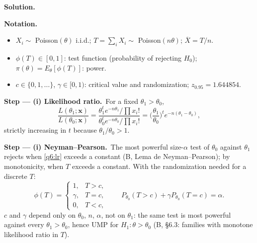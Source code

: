\documentclass[11pt,a4paper]{article}
\numberwithin{equation}{questao}   %
\newenvironment{notacao}{\par\smallskip\noindent\textbf{Notation.}\begin{itemize}[leftmargin=1.4em,topsep=1pt,itemsep=0pt]\small}{\end{itemize}}
\newcommand{\passo}[2]{\par\smallskip\noindent\textbf{Step --- #1.}~#2}
\newcommand{\solhead}{\par\medskip\noindent{\color{blue!55!black}\rule{\linewidth}{0.3pt}}\par\noindent\textbf{Solution.}}
\newcommand{\1}{\mathbf{1}}
\begin{document}
\begin{sol}
\solhead
\begin{notacao}
\item $X_i\sim$ Poisson$(\theta)$ i.i.d.; $T=\sum_iX_i\sim$ Poisson$(n\theta)$; $\overline X=T/n$.
\item $\phi(T)\in[0,1]$: test function (probability of rejecting $H_0$); $\pi(\theta)=E_\theta[\phi(T)]$: power.
\item $c\in\{0,1,\dots\}$, $\gamma\in[0,1)$: critical value and randomization; $z_{0.95}=1.644854$.
\end{notacao}

\passo{(i) Likelihood ratio}{For a fixed $\theta_1>\theta_0$,}
\begin{equation}\label{q6:lr}
\frac{L(\theta_1;\mathbf x)}{L(\theta_0;\mathbf x)}=\frac{\theta_1^te^{-n\theta_1}/\prod x_i!}{\theta_0^te^{-n\theta_0}/\prod x_i!}
=\Big(\frac{\theta_1}{\theta_0}\Big)^{t}e^{-n(\theta_1-\theta_0)},
\end{equation}
strictly increasing in $t$ because $\theta_1/\theta_0>1$.

\passo{(i) Neyman--Pearson}{The most powerful size-$\alpha$ test of $\theta_0$ against $\theta_1$
rejects when \eqref{q6:lr} exceeds a constant (B, Lema de Neyman--Pearson); by monotonicity, when
$T$ exceeds a constant. With the randomization needed for a discrete $T$:}
\begin{equation}\label{q6:phi}
\phi(T)=\begin{cases}1,&T>c,\\ \gamma,&T=c,\\ 0,&T<c,\end{cases}\qquad
P_{\theta_0}(T>c)+\gamma P_{\theta_0}(T=c)=\alpha .
\end{equation}
$c$ and $\gamma$ depend only on $\theta_0$, $n$, $\alpha$, not on $\theta_1$: the same test is most
powerful against every $\theta_1>\theta_0$, hence UMP for $H_1:\theta>\theta_0$ (B, §6.3: families
with monotone likelihood ratio in $T$).


\end{sol}
\end{document}
